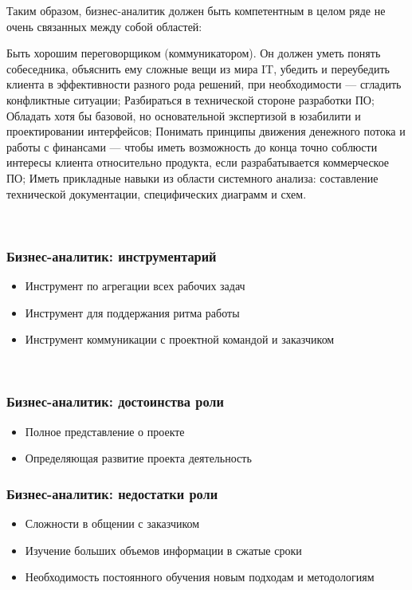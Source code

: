 \documentclass{../industrial-development}
\begin{document}
\lecturenotes
Таким образом, бизнес-аналитик должен быть компетентным в целом ряде не очень связанных между собой областей:

Быть хорошим переговорщиком (коммуникатором). Он должен уметь понять собеседника, объяснить ему сложные вещи из мира IT, убедить и переубедить клиента в эффективности разного рода решений, при необходимости — сгладить конфликтные ситуации;
Разбираться в технической стороне разработки ПО;
Обладать хотя бы базовой, но основательной экспертизой в юзабилити и проектировании интерфейсов;
Понимать принципы движения денежного потока и работы с финансами — чтобы иметь возможность до конца точно соблюсти интересы клиента относительно продукта, если разрабатывается коммерческое ПО;
Иметь прикладные навыки из области системного анализа: составление технической документации, специфических диаграмм и схем.

 ~\cite{Business}

\begin{frame} \frametitle{Бизнес-аналитик: инструментарий}
  \begin{itemize}
	\item Инструмент по агрегации всех рабочих задач
	\item Инструмент для поддержания ритма работы
	\item Инструмент коммуникации с проектной командой и заказчиком
	\end{itemize}
\end{frame}

  ~\cite{Business}

\begin{frame} \frametitle{Бизнес-аналитик: достоинства роли}
  \begin{itemize}
	\item Полное представление о проекте
	\item Определяющая развитие проекта деятельность
	\end{itemize}
\end{frame}

\begin{frame} \frametitle{Бизнес-аналитик: недостатки роли}
  \begin{itemize}
	\item Сложности в общении с заказчиком
	\item Изучение больших объемов информации в сжатые сроки
	\item Необходимость постоянного обучения новым подходам и методологиям
	\end{itemize}
\end{frame}
\end{document}
